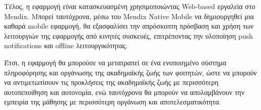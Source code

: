         Τέλος, η εφαρμογή είναι κατασκευασμένη χρησιμοποιώντας Web-based εργαλεία στο Mendix. Μπορεί ταυτόχρονα, μέσω του Mendix Native Mobile να δημιουργηθεί μια καθαρά mobile εφαρμογή, θα εξασφαλίσει την απρόσκοπτη πρόσβαση και χρήση των λειτουργιών της εφαρμογής από κινητές συσκευές, επιτρέποντας την υλοποίηση push notifications και offline λειτουργικότητας.

        Έτσι, η εφαρμογή θα μπορούσε να μετατραπεί σε ένα ενοποιημένο σύστημα πληροφόρησης και οργάνωσης της ακαδημαϊκής ζωής των φοιτητών, ώστε να μπορούν να αντιμετωπίσουν τις προκλήσεις της ακαδημαϊκής ζωής με περισσότερη αυτοπεποίθηση και αυτονομία, ενώ ταυτόχρονα θα μπορούν να απολαμβάνουν την εμπειρία της μάθησης με περισσότερη οργάνωση και αποτελεσματικότητα.
